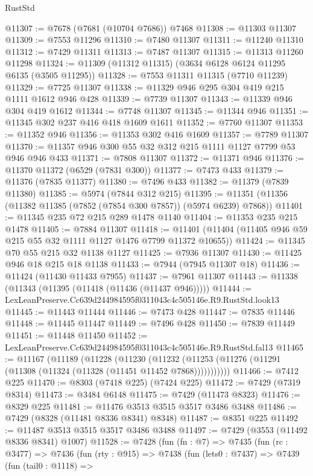 \begin{lexlean}{RustStd}
\begin{coremodule}
@11307 := @7678 (@7681 (@10704 @7686)) @7468
@11308 := @11303 @11307
@11309 := @7553 @11296
@11310 := @7480 @11307
@11311 := @11240 @11310
@11312 := @7429 @11311
@11313 := @7487 @11307
@11315 := @11313 @11260 @11298
@11324 := @11309 (@11312 @11315) (@3634 @6128 @6124 @11295 @6135 (@3505 @11295))
@11328 := @7553 @11311 @11315 (@7710 @11239)
@11329 := @7725 @11307
@11338 := @11329 @946 @295 @304 @419 @215 @1111 @1612 @946 @428
@11339 := @7739 @11307
@11343 := @11339 @946 @304 @419 @1612
@11344 := @7748 @11307
@11345 := @11344 @946
@11351 := @11345 @302 @237 @416 @418 @1609 @1611
@11352 := @7760 @11307
@11353 := @11352 @946
@11356 := @11353 @302 @416 @1609
@11357 := @7789 @11307
@11370 := @11357 @946 @300 @55 @32 @312 @215 @1111 @1127 @7799 @53 @946 @946 @433
@11371 := @7808 @11307
@11372 := @11371 @946
@11376 := @11370 @11372 (@6529 (@7831 @300))
@11377 := @7473 @433
@11379 := @11376 (@7835 @11377)
@11380 := @7496 @433
@11382 := @11379 (@7839 @11380)
@11385 := @5974 (@7844 @312 @215)
@11395 := @11351 (@11356 (@11382 @11385 (@7852 (@7854 @300 @7857)) (@5974 @6239) @7868))
@11401 := @11345 @235 @72 @215 @289 @1478 @1140
@11404 := @11353 @235 @215 @1478
@11405 := @7884 @11307
@11418 := @11401 (@11404 (@11405 @946 @59 @215 @55 @32 @1111 @1127 @1476 @7799 @11372 @10655))
@11424 := @11345 @70 @55 @215 @32 @1138 @1127
@11425 := @7936 @11307
@11430 := @11425 @946 @18 @215 @18 @1138
@11433 := @7944 (@7945 @11307 @18)
@11436 := @11424 (@11430 @11433 @7955)
@11437 := @7961 @11307
@11443 := @11338 (@11343 (@11395 (@11418 (@11436 (@11437 @946)))))
@11444 := LexLeanPreserve.Cc639d244984595f0311043c4c505146e.R9.RustStd.look13
@11445 := @11443 @11444
@11446 := @7473 @428
@11447 := @7835 @11446
@11448 := @11445 @11447
@11449 := @7496 @428
@11450 := @7839 @11449
@11451 := @11448 @11450
@11452 := LexLeanPreserve.Cc639d244984595f0311043c4c505146e.R9.RustStd.fal13
@11465 := @11167
    (@11189
      (@11228
        (@11230
          (@11232 (@11253 (@11276 (@11291 (@11308 (@11324 (@11328 (@11451 @11452 @7868)))))))))))
@11466 := @7412 @225
@11470 := @8303 (@7418 @225) (@7424 @225)
@11472 := @7429 (@7319 @8314)
@11473 := @3484 @6148
@11475 := @7429 (@11473 @8323)
@11476 := @8329 @225
@11481 := @11476 @3513 @3515 @3517 @3486 @3488
@11486 := @7429 (@8328 (@11481 @8336 @8341) @8348)
@11487 := @8351 @225
@11492 := @11487 @3513 @3515 @3517 @3486 @3488
@11497 := @7429 (@3553 (@11492 @8336 @8341) @1007)
@11528 := @7428
    (fun (fn : @7) =>
    @7435
      (fun (rc : @3477) =>
      @7436
        (fun (rty : @915) =>
        @7438
          (fun (lets0 : @7437) =>
          @7439
            (fun (tail0 : @1118) =>

\end{coremodule}
\end{lexlean}
